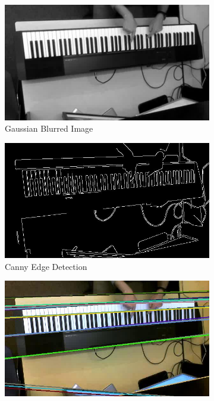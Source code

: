 \documentclass[10pt,twocolumn,letterpaper]{article}
\begin{document}
\begin{figure}[h!]
      \begin{subfigure}{0.23\textwidth}
        \includegraphics[width=\linewidth]{fig/3.jpg}
        \caption{Gaussian Blurred Image} \label{fig:b}
      \end{subfigure}\hspace*{\fill}
      \begin{subfigure}{0.23\textwidth}
        \includegraphics[width=\linewidth]{fig/4.jpg}
        \caption{Canny Edge Detection} \label{fig:c}
      \end{subfigure}
      \begin{subfigure}{0.23\textwidth}
        \includegraphics[width=\linewidth]{fig/5.jpg}

\end{subfigure}
\end{figure}
\end{document}
